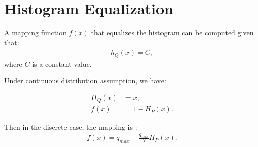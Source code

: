 \documentclass[12pt]{article}
\begin{document}
\section{Histogram Equalization}
A mapping function $f(x)$ that equalizes the histogram can be computed given that:
\begin{align}
h_Q(x) = C,
\end{align}
where $C$ is a constant value. 

Under continuous distribution assumption, we have:

\begin{align}
H_Q(x) &= x, \\
f(x) & = 1 - H_P(x).
\end{align}

Then in the discrete case, the mapping is :
\begin{align}
f(x) =  q_{max} - \frac{q_{max}}{N}H_P(x).
\end{align}
\end{document}
